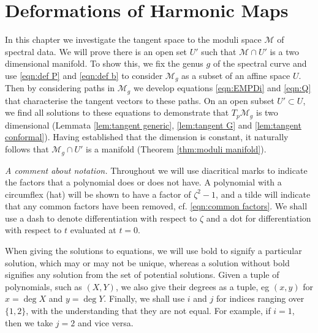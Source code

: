 
\chapter{Deformations of Harmonic Maps}
\label{chp:Deformation}

In this chapter we investigate the tangent space to the moduli space $\mathcal{M}$ of spectral data. We will prove there is an open set $U'$ such that $\mathcal{M}\cap U'$ is a two dimensional manifold. To show this, we fix the genus $g$ of the spectral curve and use \eqref{eqn:def P} and \eqref{eqn:def b} to consider $\mathcal{M}_g$ as a subset of an affine space $U$. Then by considering paths in $\mathcal{M}_g$ we develop equations \eqref{eqn:EMPDi} and \eqref{eqn:Q} that characterise the tangent vectors to these paths. On an open subset $U' \subset U$, we find all solutions to these equations to demonstrate that $T_p\mathcal{M}_g$ is two dimensional (Lemmata \ref{lem:tangent generic}, \ref{lem:tangent G} and \ref{lem:tangent conformal}). Having established that the dimension is constant, it naturally follows that $\mathcal{M}_g\cap U'$ is a manifold (Theorem \ref{thm:moduli manifold}).

\emph{A comment about notation.} Throughout we will use diacritical marks to indicate the factors that a polynomial does or does not have. A polynomial with a circumflex (hat) will be shown to have a factor of $ζ^2-1$, and a tilde will indicate that any common factors have been removed, cf. \eqref{eqn:common factors}. We shall use a dash to denote differentiation with respect to $ζ$ and a dot for differentiation with respect to $t$ evaluated at $t=0$.

When giving the solutions to equations, we will use bold to signify a particular solution, which may or may not be unique, whereas a solution without bold signifies any solution from the set of potential solutions. Given a tuple of polynomials, such as $(X,Y)$, we also give their degrees as a tuple, eg $(x,y)$ for $x=\deg X$ and $y=\deg Y$. Finally, we shall use $i$ and $j$ for indices ranging over $\{1,2\}$, with the understanding that they are not equal. For example, if $i=1$, then we take $j=2$ and vice versa.


